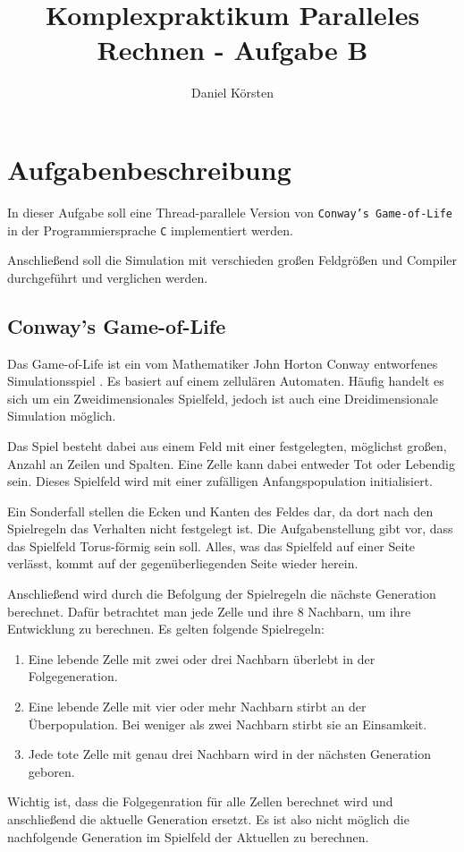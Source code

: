 \documentclass[german,plainarticle,hyperref,utf8]{zihpub}
\author{Daniel Körsten}
\title{Komplexpraktikum Paralleles Rechnen - Aufgabe B}
\begin{document}
	\section{Aufgabenbeschreibung}
	In dieser Aufgabe soll eine Thread-parallele Version von \texttt{Conway’s Game-of-Life} in der Programmiersprache \texttt{C} implementiert werden.
	
	Anschließend soll die Simulation mit verschieden großen Feldgrößen und Compiler durchgeführt und verglichen werden.
	
	\subsection{Conway’s Game-of-Life}
	Das Game-of-Life ist ein vom Mathematiker John Horton Conway entworfenes Simulationsspiel \cite{gardner}. Es basiert auf einem zellulären Automaten. Häufig handelt es sich um ein Zweidimensionales Spielfeld, jedoch ist auch eine Dreidimensionale Simulation möglich.
	
	Das Spiel besteht dabei aus einem Feld mit einer festgelegten, möglichst großen, Anzahl an Zeilen und Spalten. Eine Zelle kann dabei entweder Tot oder Lebendig sein. Dieses Spielfeld wird mit einer zufälligen Anfangspopulation initialisiert.
	
	Ein Sonderfall stellen die Ecken und Kanten des Feldes dar, da dort nach den Spielregeln das Verhalten nicht festgelegt ist. Die Aufgabenstellung gibt vor, dass das Spielfeld Torus-förmig sein soll. Alles, was das Spielfeld auf einer Seite verlässt, kommt auf der gegenüberliegenden Seite wieder herein.
	
	Anschließend wird durch die Befolgung der Spielregeln die nächste Generation berechnet. Dafür betrachtet man jede Zelle und ihre 8 Nachbarn, um ihre Entwicklung zu berechnen. Es gelten folgende Spielregeln:
	\begin{enumerate}
		\item Eine lebende Zelle mit zwei oder drei Nachbarn überlebt in der Folgegeneration.
		\item Eine lebende Zelle mit vier oder mehr Nachbarn stirbt an der Überpopulation. Bei weniger als zwei Nachbarn stirbt sie an Einsamkeit.
		\item Jede tote Zelle mit genau drei Nachbarn wird in der nächsten Generation geboren.
	\end{enumerate}
	Wichtig ist, dass die Folgegenration für alle Zellen berechnet wird und anschließend die aktuelle Generation ersetzt. Es ist also nicht möglich die nachfolgende Generation im Spielfeld der Aktuellen zu berechnen.
	
\end{document}
